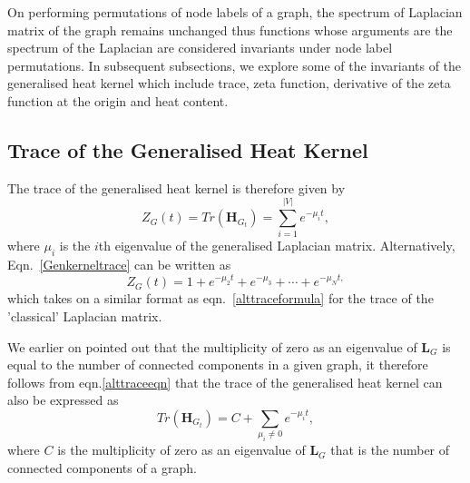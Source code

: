 \documentclass[10pt,a4paper]{article}
\theoremstyle{plain}
\theoremstyle{definition}
\begin{document}
        On performing permutations of node labels of a graph, the spectrum of Laplacian matrix of the graph remains unchanged thus functions whose arguments are the spectrum of the Laplacian are considered invariants under node label permutations. In subsequent subsections, we explore some of the invariants of the generalised heat kernel which include trace, zeta function, derivative of the zeta function at the origin and heat content.
        
        \subsection{Trace of the Generalised Heat Kernel}
        The trace of the generalised heat kernel is therefore given by
        \begin{equation}
        Z_{G}(t) = Tr(\mathbf{H}_{G_t}) = \sum_{i=1}^{|V|} e^{-\mu_i t},
        \label{Genkerneltrace}
        \end{equation}
         where $\mu_{i}$ is the $i$th eigenvalue of the generalised Laplacian matrix.
        Alternatively, Eqn.~\ref{Genkerneltrace} can be written as 
        \begin{equation}
        Z_{G}(t) =  1+ e^{-\mu_{2} t} + e^{-\mu_{3}} + \cdots + e^{-\mu_{N} t,}
        \label{alttraceeqn}
        \end{equation}
        which takes on a similar format as eqn.~\ref{alttraceformula} for the trace of the 'classical' Laplacian matrix.
        
        We earlier on pointed out that the multiplicity of zero as an eigenvalue of $\mathbf{L}_G$ is equal to the number of connected components in a given graph, it therefore follows from eqn.\ref{alttraceeqn} that 
        the trace of the generalised heat kernel can also be expressed as 
        \begin{equation}
        Tr(\mathbf{H}_{G_t}) = C + \sum_{\mu_i \neq 0} e^{-\mu_i t}
        \label{kernelexp2},
        \end{equation}
        where $C$ is the multiplicity of zero as an eigenvalue of $\mathbf{L}_G$ that is the number of connected components of a graph.
        
\end{document}
